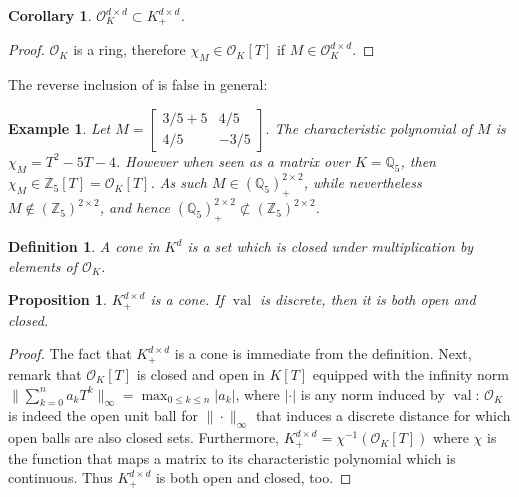 \documentclass[sigconf]{acmart}
\newtheorem{proposition}[theorem]{Proposition}
\newtheorem{corollary}[theorem]{Corollary}
\newtheorem{definition}[theorem]{Definition}
\newtheorem{example}[theorem]{Example}
\DeclareMathOperator{\val}{val}
\newcommand{\OK}{\mathcal{O}_K}
\begin{document}
\begin{corollary}\label{cor_caracsdp}
  $\OK^{d\times d} \subset K^{d\times d}_+$.
\end{corollary}
\begin{proof}
  $\OK$ is a ring, therefore $\chi_M \in \OK[T]$ if $M \in \OK^{d \times d}$.
\end{proof}
The reverse inclusion of  is false in general:
\begin{example}
  Let
  $
  M = \left[\begin{smallmatrix} {3}/{5}+5 & {4}/{5} \\ {4}/{5} & -{3}/{5} \end{smallmatrix}\right].
  $
  The characteristic polynomial of $M$
  is $\chi_M = T^2-5T-4$. However when seen as a matrix over $K=\mathbb{Q}_5$, then $\chi_M \in \mathbb{Z}_5[T] = \OK[T]$. As such $M \in (\mathbb{Q}_5)^{2 \times 2}_+$, while nevertheless $M \not\in (\mathbb{Z}_5)^{2\times 2}$, and hence
  $(\mathbb{Q}_5)^{2 \times 2}_+ \not\subset (\mathbb{Z}_5)^{2 \times 2}$. 
\end{example}

\begin{definition}
  A \emph{cone} in $K^d$ is a set which is closed under multiplication by elements of $\OK$.
\end{definition}

\begin{proposition}
  $K^{d \times d}_+$ is a cone.
  If $\val$ is discrete, then it is both open and closed.
\end{proposition}
\begin{proof}
  The fact that $K^{d \times d}_+$ is a cone is immediate from the definition.
  Next, remark that $\OK[T]$ is closed and open in $K[T]$ equipped with the infinity norm
  $\| \sum_{k=0}^{n} a_k T^k \|_\infty = \max_{0 \leq k \leq n} |a_k|$,
  {where $|\cdot|$ is any norm induced by $\val$}:
  $\OK$ is indeed the open unit ball for $\|\cdot \|_\infty$ that induces a discrete distance for
  which open balls are also closed sets.
  Furthermore, $K^{d\times d}_+ = \chi^{-1}(\OK[T]) $ where $\chi$ is the function that maps a
  matrix to its characteristic polynomial which is continuous.
  Thus $K^{d\times d}_+$ is both open and closed, too.
\end{proof}
\end{document}
